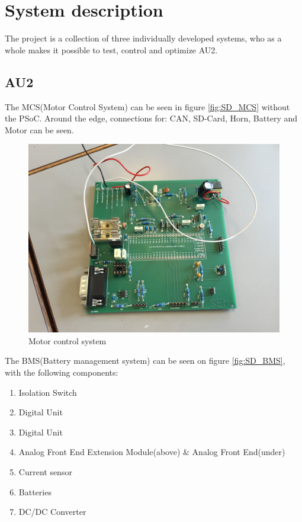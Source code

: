 \chapter{System description}
The project is a collection of three individually developed systems, who as a whole makes it possible to test, control and optimize AU2.

\section{AU2}
The MCS(Motor Control System) can be seen in figure \vref{fig:SD_MCS} without the PSoC. Around the edge, connections for: CAN, SD-Card, Horn, Battery and Motor can be seen.

\begin{figure}[H]
	\centering
	\includegraphics[width=0.6\linewidth]{SubPages/Images/SD_MCS}
	\caption{Motor control system}
	\label{fig:SD_MCS}
\end{figure}

The BMS(Battery management system) can be seen on figure \vref{fig:SD_BMS}, with the following components:

\begin{enumerate}
	\item Isolation Switch
	\item Digital Unit
	\item Digital Unit 
	\item Analog Front End Extension Module(above) \& Analog Front End(under)
	\item Current sensor
	\item Batteries
	\item DC/DC Converter
\end{enumerate}

